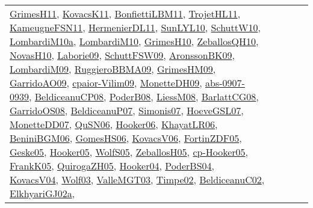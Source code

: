 {\begin{longtable}{lp{3cm}>{\raggedright}p{6cm}>{\raggedright}p{6cm}p{8cm}}
\href{papers/GrimesH11.pdf}{GrimesH11}\cite{GrimesH11}, \href{articles/KovacsK11.pdf}{KovacsK11}\cite{KovacsK11}, \href{papers/BonfiettiLBM11.pdf}{BonfiettiLBM11}\cite{BonfiettiLBM11}, \href{articles/TrojetHL11.pdf}{TrojetHL11}\cite{TrojetHL11}, \href{papers/KameugneFSN11.pdf}{KameugneFSN11}\cite{KameugneFSN11}, \href{papers/HermenierDL11.pdf}{HermenierDL11}\cite{HermenierDL11}, \href{papers/SunLYL10.pdf}{SunLYL10}\cite{SunLYL10}, \href{papers/SchuttW10.pdf}{SchuttW10}\cite{SchuttW10}, \href{articles/LombardiM10a.pdf}{LombardiM10a}\cite{LombardiM10a}, \href{papers/LombardiM10.pdf}{LombardiM10}\cite{LombardiM10}, \href{papers/GrimesH10.pdf}{GrimesH10}\cite{GrimesH10}, \href{articles/ZeballosQH10.pdf}{ZeballosQH10}\cite{ZeballosQH10}, \href{articles/NovasH10.pdf}{NovasH10}\cite{NovasH10}, \href{papers/Laborie09.pdf}{Laborie09}\cite{Laborie09}, \href{papers/SchuttFSW09.pdf}{SchuttFSW09}\cite{SchuttFSW09}, \href{papers/AronssonBK09.pdf}{AronssonBK09}\cite{AronssonBK09}, \href{papers/LombardiM09.pdf}{LombardiM09}\cite{LombardiM09}, \href{articles/RuggieroBBMA09.pdf}{RuggieroBBMA09}\cite{RuggieroBBMA09}, \href{papers/GrimesHM09.pdf}{GrimesHM09}\cite{GrimesHM09}, \href{articles/GarridoAO09.pdf}{GarridoAO09}\cite{GarridoAO09}, \href{papers/cpaior-Vilim09.pdf}{cpaior-Vilim09}\cite{cpaior-Vilim09}, \href{papers/MonetteDH09.pdf}{MonetteDH09}\cite{MonetteDH09}, \href{articles/abs-0907-0939.pdf}{abs-0907-0939}\cite{abs-0907-0939}, \href{papers/BeldiceanuCP08.pdf}{BeldiceanuCP08}\cite{BeldiceanuCP08}, \href{papers/PoderB08.pdf}{PoderB08}\cite{PoderB08}, \href{articles/LiessM08.pdf}{LiessM08}\cite{LiessM08}, \href{papers/BarlattCG08.pdf}{BarlattCG08}\cite{BarlattCG08}, \href{articles/GarridoOS08.pdf}{GarridoOS08}\cite{GarridoOS08}, \href{papers/BeldiceanuP07.pdf}{BeldiceanuP07}\cite{BeldiceanuP07}, \href{articles/Simonis07.pdf}{Simonis07}\cite{Simonis07}, \href{papers/HoeveGSL07.pdf}{HoeveGSL07}\cite{HoeveGSL07}, \href{papers/MonetteDD07.pdf}{MonetteDD07}\cite{MonetteDD07}, \href{papers/QuSN06.pdf}{QuSN06}\cite{QuSN06}, \href{articles/Hooker06.pdf}{Hooker06}\cite{Hooker06}, \href{articles/KhayatLR06.pdf}{KhayatLR06}\cite{KhayatLR06}, \href{papers/BeniniBGM06.pdf}{BeniniBGM06}\cite{BeniniBGM06}, \href{papers/GomesHS06.pdf}{GomesHS06}\cite{GomesHS06}, \href{papers/KovacsV06.pdf}{KovacsV06}\cite{KovacsV06}, \href{papers/FortinZDF05.pdf}{FortinZDF05}\cite{FortinZDF05}, \href{papers/Geske05.pdf}{Geske05}\cite{Geske05}, \href{articles/Hooker05.pdf}{Hooker05}\cite{Hooker05}, \href{papers/WolfS05.pdf}{WolfS05}\cite{WolfS05}, \href{articles/ZeballosH05.pdf}{ZeballosH05}\cite{ZeballosH05}, \href{papers/cp-Hooker05.pdf}{cp-Hooker05}\cite{cp-Hooker05}, \href{papers/FrankK05.pdf}{FrankK05}\cite{FrankK05}, \href{papers/QuirogaZH05.pdf}{QuirogaZH05}\cite{QuirogaZH05}, \href{papers/Hooker04.pdf}{Hooker04}\cite{Hooker04}, \href{articles/PoderBS04.pdf}{PoderBS04}\cite{PoderBS04}, \href{papers/KovacsV04.pdf}{KovacsV04}\cite{KovacsV04}, \href{papers/Wolf03.pdf}{Wolf03}\cite{Wolf03}, \href{papers/ValleMGT03.pdf}{ValleMGT03}\cite{ValleMGT03}, \href{articles/Timpe02.pdf}{Timpe02}\cite{Timpe02}, \href{papers/BeldiceanuC02.pdf}{BeldiceanuC02}\cite{BeldiceanuC02}, \href{papers/ElkhyariGJ02a.pdf}{ElkhyariGJ02a}\cite{ElkhyariGJ02a}, 
\end{longtable}}
